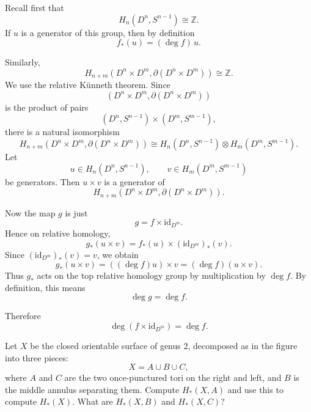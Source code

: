 \begin{solution}
Recall first that
\[
H_n(D^n,S^{n-1})\cong \mathbb Z.
\]
If \(u\) is a generator of this group, then by definition
\[
f_*(u)=(\deg f)\,u.
\]

Similarly,
\[
H_{n+m}(D^n\times D^m,\partial(D^n\times D^m))\cong \mathbb Z.
\]
We use the relative K\"unneth theorem. Since
\[
(D^n\times D^m,\partial(D^n\times D^m))
\]
is the product of pairs
\[
(D^n,S^{n-1})\times (D^m,S^{m-1}),
\]
there is a natural isomorphism
\[
H_{n+m}(D^n\times D^m,\partial(D^n\times D^m))
\cong
H_n(D^n,S^{n-1})\otimes H_m(D^m,S^{m-1}).
\]
Let
\[
u\in H_n(D^n,S^{n-1}),\qquad v\in H_m(D^m,S^{m-1})
\]
be generators. Then \(u\times v\) is a generator of
\[
H_{n+m}(D^n\times D^m,\partial(D^n\times D^m)).
\]

Now the map \(g\) is just
\[
g=f\times \mathrm{id}_{D^m}.
\]
Hence on relative homology,
\[
g_*(u\times v)=f_*(u)\times (\mathrm{id}_{D^m})_*(v).
\]
Since \((\mathrm{id}_{D^m})_*(v)=v\), we obtain
\[
g_*(u\times v)=((\deg f)u)\times v=(\deg f)(u\times v).
\]
Thus \(g_*\) acts on the top relative homology group by multiplication by \(\deg f\). By definition, this means
\[
\deg g=\deg f.
\]

Therefore
\[
\boxed{\deg(f\times \mathrm{id}_{D^m})=\deg f.}
\]
\end{solution}

\begin{problem}
Let \(X\) be the closed orientable surface of genus \(2\), decomposed as in the figure into three pieces:
\[
X=A\cup B\cup C,
\]
where \(A\) and \(C\) are the two once-punctured tori on the right and left, and \(B\) is the middle annulus separating them. Compute \(H_*(X,A)\) and use this to compute \(H_*(X)\). What are \(H_*(X,B)\) and \(H_*(X,C)\)?

\par
\end{problem}

